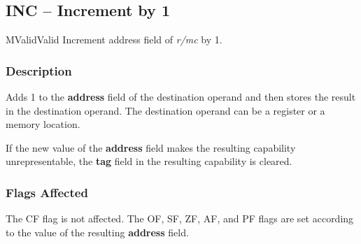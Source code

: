 \clearpage
{}
{}
\subsection*{INC -- Increment by 1}

\begin{x86opcodetable}
  {M}{Valid}{Valid}
  {Increment address field of \emph{r/mc} by 1.}
\end{x86opcodetable}

\begin{x86opentable}
\end{x86opentable}

\subsubsection*{Description}

Adds 1 to the \textbf{address} field of the destination operand and
then stores the result in the destination operand. The destination
operand can be a register or a memory location.

If the new value of the \textbf{address} field makes the resulting
capability unrepresentable, the \textbf{tag} field in the resulting
capability is cleared.

\subsubsection*{Flags Affected}

The CF flag is not affected.  The OF, SF, ZF, AF, and PF flags are set
according to the value of the resulting \textbf{address} field.
